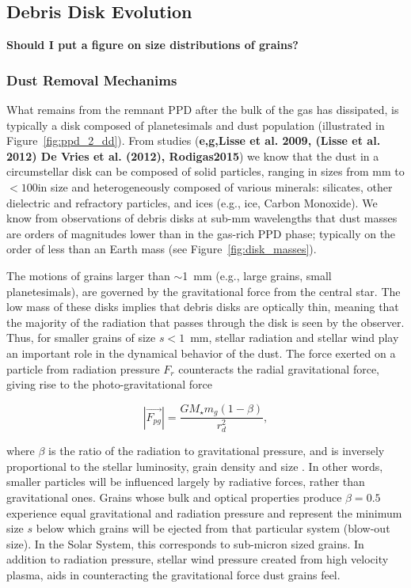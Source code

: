         
    \subsection{Debris Disk Evolution}\label{sec:debrisdisk_phase}
    
    \textbf{Should I put a figure on size distributions of grains?}
    \subsubsection{Dust Removal Mechanims}
    What remains from the remnant PPD after the bulk of the gas has dissipated, is typically a disk composed of planetesimals and dust population (illustrated in Figure~\ref{fig:ppd_2_dd}). From studies (\textbf{e,g,Lisse	et	al.	2009, (Lisse	et	al.	2012) 	De	Vries	et	al.	(2012), Rodigas2015}) we know that the dust in a circumstellar disk can be composed of solid particles, ranging in sizes from mm to $<100$\micron in size and heterogeneously composed of various minerals: silicates, other dielectric and refractory particles, and ices (e.g., ice, Carbon Monoxide). We know from observations of debris disks at sub-mm wavelengths that dust masses are orders of magnitudes lower than in the gas-rich PPD phase; typically on the order of less than an Earth mass (see Figure~\ref{fig:disk_masses}). 

    The motions of grains larger than $\sim$1~mm (e.g., large grains, small planetesimals), are governed by the gravitational force from the central star. The low mass of these disks implies that debris disks are optically thin, meaning that the majority of the radiation that passes through the disk is seen by the observer. Thus, for smaller grains of size $s<1$~mm, stellar radiation and stellar wind play an important role in the dynamical behavior of the dust. The force exerted on a particle from radiation pressure $F_r$ counteracts the radial gravitational force, giving rise to the photo-gravitational force
    
    \begin{equation}\label{eq:photograv_force}
    \left|\vec{F_{pg}}\right|= \frac{GM_\star m_g(1-\beta)}{r_d^2},
    \end{equation}
    
    \noindent where $\beta$ is the ratio of the radiation to gravitational pressure, and is inversely proportional to the stellar luminosity, grain density and size \citep{Burns1979}. In other words, smaller particles will be influenced largely by radiative forces, rather than gravitational ones. Grains whose bulk and optical properties produce $\beta=0.5$ experience equal gravitational and radiation pressure and represent the minimum size $s$ below which grains will be ejected from that particular system (blow-out size). In the Solar System, this corresponds to sub-micron sized grains. In addition to radiation pressure, stellar wind pressure created from high velocity plasma, aids in counteracting the gravitational force dust grains feel. 

